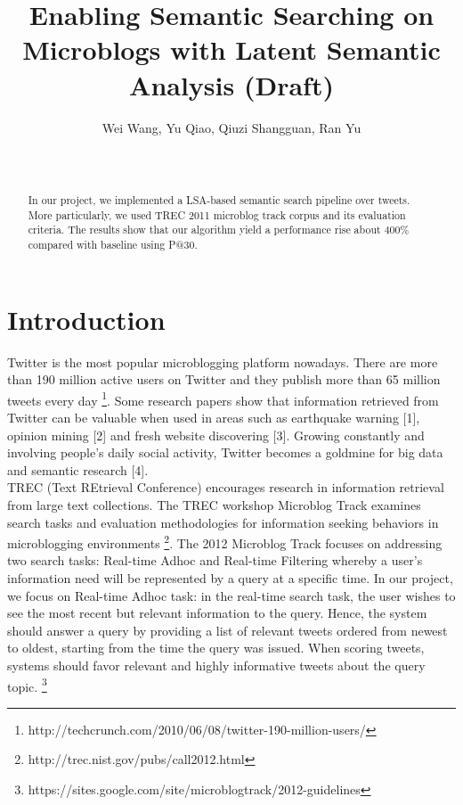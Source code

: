\documentclass{acm_proc_article-sp}
\begin{document}
\title{Enabling Semantic Searching on Microblogs with Latent Semantic Analysis (Draft) 
}


\author{\alignauthor Wei Wang, Yu Qiao, Qiuzi Shangguan, Ran Yu \\
 \\ 
 \\
} 
\maketitle

\begin{abstract}
In our project, we implemented a LSA-based semantic search pipeline over tweets. More particularly, we used TREC 2011 microblog track corpus and its evaluation criteria. The results show that our algorithm yield a performance rise about 400\% compared with baseline using P@30. 
\end{abstract}

\section{Introduction}
Twitter is the most popular microblogging platform nowadays. There are more than 190 million active users on Twitter and they publish more than 65 million tweets every day \footnote{http://techcrunch.com/2010/06/08/twitter-190-million-users/}. Some research papers show that information retrieved from Twitter can be valuable when used in areas such as earthquake warning [1], opinion mining [2] and fresh website discovering [3]. Growing constantly and involving people's daily social activity, Twitter becomes a goldmine for big data and semantic research [4].\\
TREC (Text REtrieval Conference) encourages research in information retrieval from large text collections. The TREC workshop Microblog Track examines search tasks and evaluation methodologies for information seeking behaviors in microblogging environments \footnote{http://trec.nist.gov/pubs/call2012.html}. The 2012 Microblog Track focuses on addressing two search tasks: Real-time Adhoc and Real-time Filtering whereby a user's information need will be represented by a query at a specific time. In our project, we focus on Real-time Adhoc task: in the real-time search task, the user wishes to see the most recent but relevant information to the query. Hence, the system should answer a query by providing a list of relevant tweets ordered from newest to oldest, starting from the time the query was issued. When scoring tweets, systems should favor relevant and highly informative tweets about the query topic. \footnote{https://sites.google.com/site/microblogtrack/2012-guidelines}
\end{document}
